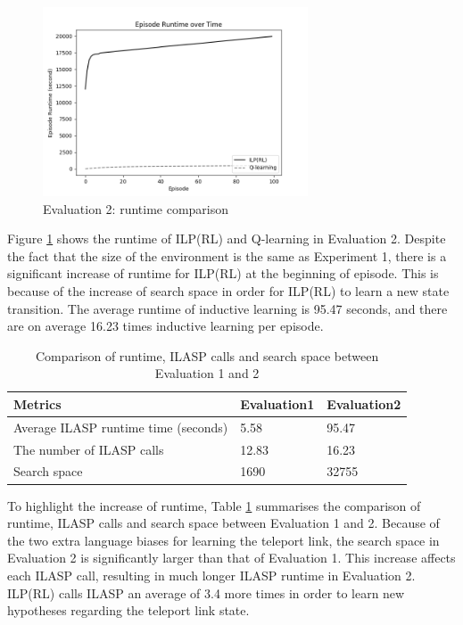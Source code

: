 \begin{figure}[!htb]
\centering
\includegraphics[width=0.7\textwidth]{./figures/experiment2_runtime}
\caption{Evaluation 2: runtime comparison}
\label{experiment2_runtime}
\end{figure}

Figure \ref{experiment2_runtime} shows the runtime of ILP(RL) and Q-learning in Evaluation 2. 
Despite the fact that the size of the environment is the same as Experiment 1,
there is a significant increase of runtime for ILP(RL) at the beginning of episode. 
This is because of the increase of search space in order for ILP(RL) to learn a new state transition.
The average runtime of inductive learning is 95.47 seconds, and there are on average 16.23 times inductive learning per episode.
\begin{table}[!ht!b]
\centering
\begin{tabular}{lll}
\hline
Metrics            & Evaluation1    & Evaluation2      \\ \hline
Average ILASP runtime time (seconds)& 5.58        & 95.47       \\
The number of ILASP calls &  12.83      & 16.23      \\
Search space &  1690      & 32755       \\
\end{tabular}
\caption{Comparison of runtime, ILASP calls and search space between Evaluation 1 and 2}
\label{table:runtime_comparison}
\end{table}

To highlight the increase of runtime, Table \ref{table:runtime_comparison} summarises the comparison of runtime, ILASP calls and search space between Evaluation 1 and 2. 
Because of the two extra language biases for learning the teleport link, the search space in Evaluation 2 is significantly larger than that of Evaluation 1. This increase affects each ILASP call, resulting in much longer ILASP runtime in Evaluation 2. ILP(RL) calls ILASP an average of 3.4 more times in order to learn new hypotheses regarding the teleport link state.

